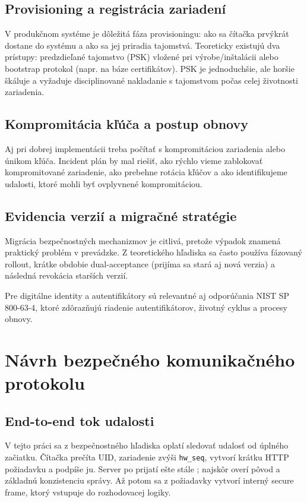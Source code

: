 \documentclass[journal,a4paper,onecolumn]{IEEEtran}
\begin{document}
\subsection{Provisioning a registrácia zariadení}

V produkčnom systéme je dôležitá fáza provisioningu: ako sa čítačka prvýkrát dostane do systému a ako sa jej priradia tajomstvá. Teoreticky existujú dva prístupy: predzdieľané tajomstvo (PSK) vložené pri výrobe/inštalácii alebo bootstrap protokol (napr. na báze certifikátov). PSK je jednoduchšie, ale horšie škáluje a vyžaduje disciplinované nakladanie s tajomstvom počas celej životnosti zariadenia.

\subsection{Kompromitácia kľúča a postup obnovy}

Aj pri dobrej implementácii treba počítať s kompromitáciou zariadenia alebo únikom kľúča. Incident plán by mal riešiť, ako rýchlo vieme zablokovať kompromitované zariadenie, ako prebehne rotácia kľúčov a ako identifikujeme udalosti, ktoré mohli byť ovplyvnené kompromitáciou.

\subsection{Evidencia verzií a migračné stratégie}

Migrácia bezpečnostných mechanizmov je citlivá, pretože výpadok znamená praktický problém v prevádzke. Z teoretického hľadiska sa často používa fázovaný rollout, krátke obdobie dual-acceptance (prijíma sa stará aj nová verzia) a následná revokácia starších verzií.


Pre digitálne identity a autentifikátory sú relevantné aj odporúčania NIST SP 800-63-4, ktoré zdôrazňujú riadenie autentifikátorov, životný cyklus a procesy obnovy.

\section{Návrh bezpečného komunikačného protokolu}

\subsection{End-to-end tok udalosti}

V tejto práci sa z bezpečnostného hľadiska oplatí sledovať udalosť od úplného začiatku. Čítačka prečíta UID, zariadenie zvýši \texttt{hw\_seq}, vytvorí krátku HTTP požiadavku a podpíše ju. Server po prijatí ešte stále ; najskôr overí pôvod a základnú konzistenciu správy. Až potom sa z požiadavky vytvorí interný secure frame, ktorý vstupuje do rozhodovacej logiky.
\end{document}
